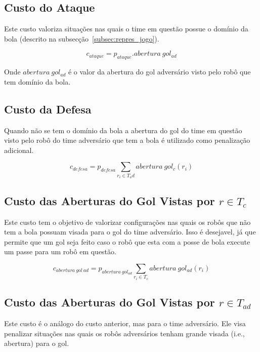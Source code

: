 \subsection{Custo do Ataque}
Este custo valoriza situações nas quais o time em questão
possue o domínio da bola (descrito na subsecção~\ref{subsec:repres_jogo}).

\begin{dmath} 
 c_{ataque} = p_{ataque} . abertura{\ }gol_{ad}
\end{dmath} 

Onde $abertura{\ }gol_{ad}$ é o valor da abertura do gol adversário visto
pelo robô que tem domínio da bola.

\subsection{Custo da Defesa}
Quando não se tem o domínio da bola a abertura do gol do time em questão
visto pelo robô do time adversário que tem a bola é utilizado
como penalização adicional.

\begin{dmath}
  c_{defesa} = p_{defesa}
   \sum_{r_i \in T_ad} abertura{\ }gol_c(r_i)
\end{dmath}

\subsection{Custo das Aberturas do Gol Vistas por $r\in T_c$}

Este custo tem o objetivo de valorizar configurações nas quais
os robôs que não tem a bola possuam visada para o gol do time
adversário. Isso
é desejavel, já que permite que um gol seja feito caso o robô
que esta com a posse de bola execute um passe para um robô
em questão.

\begin{dmath}
   c_{abertura{\ }gol{\ }ad} = p_{abertura{\ }gol_{ad}}
    \sum_{r_i \in T_c} abertura{\ }gol_{ad}(r_i)
\end{dmath}

\subsection{Custo das Aberturas do Gol Vistas por $r\in T_{ad}$}

Este custo é o análogo do custo anterior, mas para o
time adversário. Ele visa penalizar situações nas quais
os robôs adversários tenham grande visada (i.e., abertura)
para o gol. 


